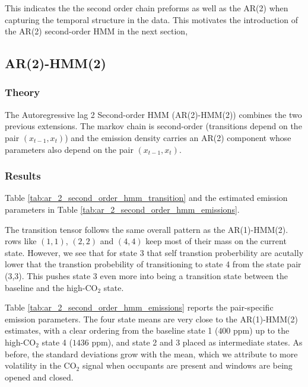 This indicates the the second order chain preforms as well as the AR(2) when
capturing the temporal structure in the data. 
This motivates the introduction of the AR(2) second-order HMM in the next section,





\subsection{AR(2)-HMM(2)}
\subsubsection{Theory}
The Autoregressive lag 2 Second-order HMM (AR(2)-HMM(2)) combines the two previous extensions. 
The markov chain is second-order (transitions depend on the 
pair $(x_{t-1}, x_t)$) and the emission density carries an AR(2) 
component whose parameters also depend
on the pair $(x_{t-1}, x_t)$. 
\subsubsection{Results}
Table \ref{tab:ar_2_second_order_hmm_transition} and the estimated emission
parameters in Table \ref{tab:ar_2_second_order_hmm_emissions}.



The transition tensor follows the same overall pattern as the  AR(1)-HMM(2). 
rows like $(1,1)$, $(2,2)$ and $(4,4)$ keep most of their mass on the
current state. However, we see that for state 3 that self transtion 
proberbility are acutally lower that the transtion probebility of transitioning to state 4
from the state pair (3,3). This pushes state 3 even more into being a transition state between 
the baseline and the high-CO$_2$ state.



Table \ref{tab:ar_2_second_order_hmm_emissions} reports the pair-specific
emission parameters. The four state means are very close to the AR(1)-HMM(2)
estimates, with a clear ordering from the baseline state 1 ($400$ ppm) up to
the high-CO$_2$ state 4 ($1436$ ppm), and state 2 and 3 placed as
intermediate states. As before, the standard deviations grow with the mean,
which we attribute to more volatility in the CO$_2$ signal when occupants
are present and windows are being opened and closed. \newline

